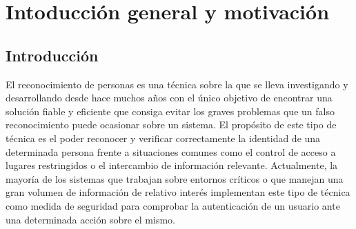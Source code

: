 
\chapter{Intoducción general y motivación} %

\label{Capítulo 1} %




\section{Introducción}
El reconocimiento de personas es una técnica sobre la que se lleva investigando y desarrollando desde hace muchos años con el único objetivo de encontrar una solución fiable y eficiente que consiga evitar los graves problemas que un falso reconocimiento puede ocasionar sobre un sistema. El propósito de este tipo de técnica es el poder reconocer y verificar correctamente la identidad de una determinada persona frente a situaciones comunes como el control de acceso a lugares restringidos o el intercambio de información relevante. Actualmente, la mayoría de los sistemas que trabajan sobre entornos críticos o que manejan una gran volumen de información de relativo interés implementan este tipo de técnica como medida de seguridad para comprobar la autenticación de un usuario ante una determinada acción sobre el mismo. \\


